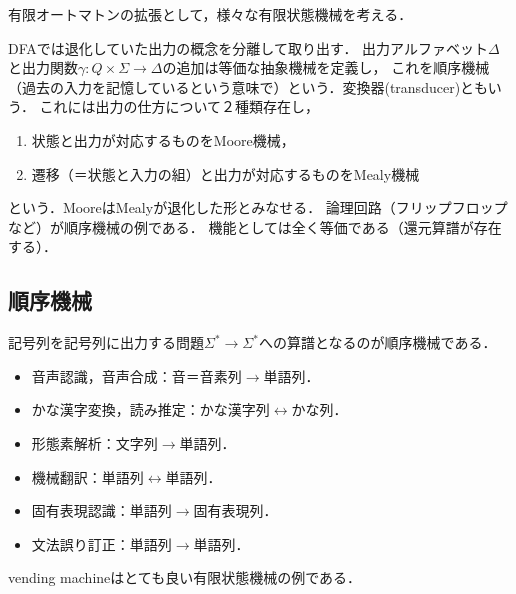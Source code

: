 \begin{tcolorbox}[colframe=ForestGreen, colback=ForestGreen!10!white, breakable,
    title=オートマトンの変遷]
    有限オートマトンの拡張として，様々な有限状態機械を考える．

    DFAでは退化していた出力の概念を分離して取り出す．
    出力アルファベット$\Delta$と出力関数$\gamma:Q\times\Sigma\to\Delta$の追加は等価な抽象機械を定義し，
    これを順序機械（過去の入力を記憶しているという意味で）という．変換器(transducer)ともいう．
    これには出力の仕方について２種類存在し，
    \begin{enumerate}
        \item 状態と出力が対応するものをMoore機械\cite{Moore}，
        \item 遷移（＝状態と入力の組）と出力が対応するものをMealy機械\cite{Mealy}
    \end{enumerate}
    という．MooreはMealyが退化した形とみなせる．
    論理回路（フリップフロップなど）が順序機械の例である．
    機能としては全く等価である（還元算譜が存在する）．
\end{tcolorbox}

\subsection{順序機械}

\begin{tcolorbox}[colframe=ForestGreen, colback=ForestGreen!10!white, breakable,
    title=transducerの応用]
    記号列を記号列に出力する問題$\Sigma^*\rightarrow\Sigma^*$への算譜となるのが順序機械である．
    \begin{itemize}
        \item 音声認識，音声合成：音＝音素列$\rightarrow$単語列．
        \item かな漢字変換，読み推定：かな漢字列$\leftrightarrow$かな列．
        \item 形態素解析：文字列$\rightarrow$単語列．
        \item 機械翻訳：単語列$\leftrightarrow$単語列．
        \item 固有表現認識：単語列$\rightarrow$固有表現列．
        \item 文法誤り訂正：単語列$\rightarrow$単語列．
    \end{itemize}
\end{tcolorbox}

\begin{example}
    vending machineはとても良い有限状態機械の例である．
\end{example}

